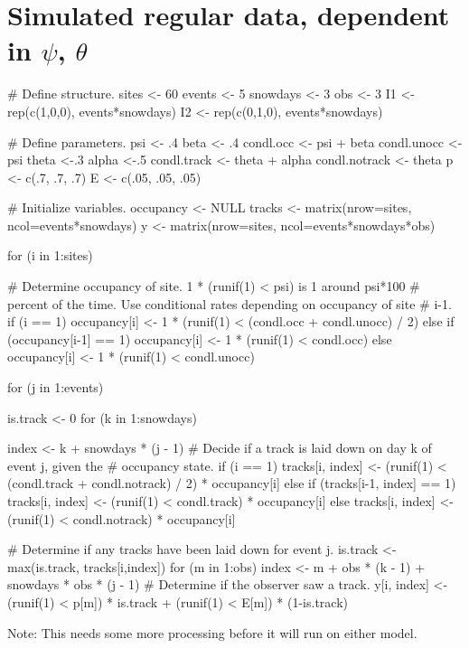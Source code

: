 \documentclass[12pt]{article}
\begin{document}
\section{Simulated regular data, dependent in $\psi$, $\theta$}
\scriptsize
\begin{verbatimtab}
# Define structure.
sites <- 60
events <- 5
snowdays <- 3
obs <- 3
I1 <- rep(c(1,0,0), events*snowdays)
I2 <- rep(c(0,1,0), events*snowdays)

# Define parameters.
psi <- .4
beta <- .4
condl.occ <- psi + beta
condl.unocc <- psi
theta <-.3
alpha <-.5
condl.track <- theta + alpha
condl.notrack <- theta
p <- c(.7, .7, .7)
E <- c(.05, .05, .05)

# Initialize variables.
occupancy <- NULL
tracks <- matrix(nrow=sites, ncol=events*snowdays)
y <- matrix(nrow=sites, ncol=events*snowdays*obs)

for (i in 1:sites) {
    # Determine occupancy of site. 1 * (runif(1) < psi) is 1 around psi*100
    # percent of the time. Use conditional rates depending on occupancy of site
    # i-1.
    if (i == 1)
        {occupancy[i] <- 1 * (runif(1) < (condl.occ + condl.unocc) / 2)}
    else if (occupancy[i-1] == 1)
        {occupancy[i] <- 1 * (runif(1) < condl.occ)}
    else
        {occupancy[i] <- 1 * (runif(1) < condl.unocc)}

    for (j in 1:events) {
        is.track <- 0
        for (k in 1:snowdays) {
            index <- k + snowdays * (j - 1)
            # Decide if a track is laid down on day k of event j, given the
            # occupancy state.
            if (i == 1) {
                tracks[i, index] <- (runif(1) <
                                     (condl.track + condl.notrack) / 2) *
                                    occupancy[i]
            } else if (tracks[i-1, index] == 1)
                {tracks[i, index] <- (runif(1) < condl.track) * occupancy[i]
            } else
                {tracks[i, index] <- (runif(1) < condl.notrack) * occupancy[i]}

            # Determine if any tracks have been laid down for event j.
            is.track <- max(is.track, tracks[i,index])
            for (m in 1:obs) {
                index <- m + obs * (k - 1) + snowdays * obs * (j - 1)
                # Determine if the observer saw a track.
                y[i, index] <- (runif(1) < p[m]) * is.track +
                               (runif(1) < E[m]) * (1-is.track)
            }
        }
    }
}
\end{verbatimtab}
Note: This needs some more processing before it will run on either model.
\end{document}
